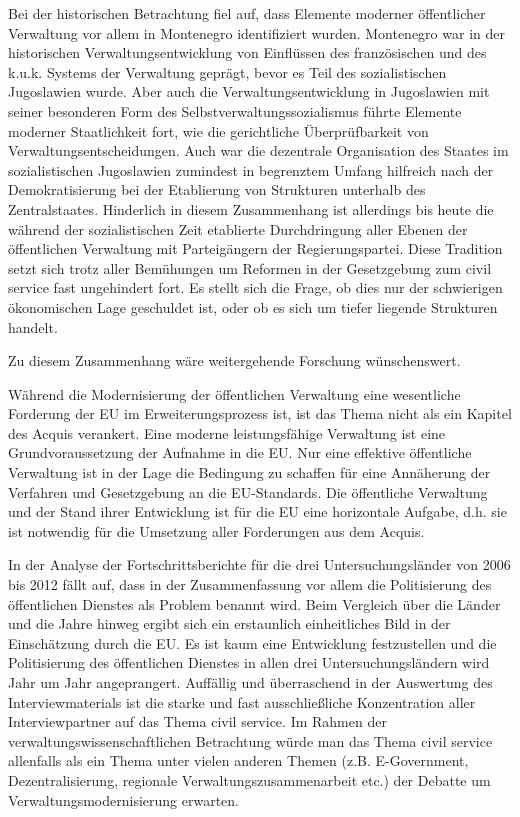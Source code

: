 Bei der historischen Betrachtung fiel auf, dass Elemente moderner öffentlicher Verwaltung vor allem in Montenegro identifiziert wurden. Montenegro war in der historischen Verwaltungsentwicklung von Einflüssen des französischen und des k.u.k. Systems der Verwaltung geprägt, bevor es Teil des sozialistischen Jugoslawien wurde. Aber auch die Verwaltungsentwicklung in Jugoslawien mit seiner besonderen Form des Selbstverwaltungssozialismus führte Elemente moderner Staatlichkeit fort, wie die gerichtliche Überprüfbarkeit von Verwaltungsentscheidungen. Auch war die dezentrale Organisation des Staates im sozialistischen Jugoslawien zumindest in begrenztem Umfang hilfreich nach der Demokratisierung bei der Etablierung von Strukturen unterhalb des Zentralstaates. Hinderlich in diesem Zusammenhang ist allerdings bis heute die während der sozialistischen Zeit etablierte Durchdringung aller Ebenen der öffentlichen Verwaltung mit Parteigängern der Regierungspartei. Diese Tradition setzt sich trotz aller Bemühungen um Reformen in der Gesetzgebung zum civil service fast ungehindert fort. Es stellt sich die Frage, ob dies nur der schwierigen ökonomischen Lage geschuldet ist, oder ob es sich um tiefer liegende Strukturen handelt. \par
Zu diesem Zusammenhang wäre weitergehende Forschung wünschenswert. \par
Während die Modernisierung der öffentlichen Verwaltung eine wesentliche Forderung der EU im Erweiterungsprozess ist, ist das Thema nicht als ein Kapitel des Acquis verankert. Eine moderne leistungsfähige Verwaltung ist eine Grundvoraussetzung der Aufnahme in die EU. Nur eine effektive öffentliche Verwaltung ist in der Lage die Bedingung zu schaffen für eine Annäherung der Verfahren und Gesetzgebung an die EU-Standards. Die öffentliche Verwaltung und der Stand ihrer Entwicklung ist für die EU eine horizontale Aufgabe, d.h. sie ist notwendig für die Umsetzung aller Forderungen aus dem Acquis.\par
In der Analyse der Fortschrittsberichte für die drei Untersuchungsländer von 2006 bis 2012 fällt auf, dass in der Zusammenfassung vor allem die Politisierung des öffentlichen Dienstes als Problem benannt wird. Beim Vergleich über die Länder und die Jahre hinweg ergibt sich ein erstaunlich einheitliches Bild in der Einschätzung durch die EU. Es ist kaum eine Entwicklung festzustellen und die Politisierung des öffentlichen Dienstes in allen drei Untersuchungsländern wird Jahr um Jahr angeprangert. Auffällig und überraschend in der Auswertung des Interviewmaterials ist die starke und fast ausschließliche Konzentration aller Interviewpartner auf das Thema civil service. Im Rahmen der verwaltungswissenschaftlichen Betrachtung würde man das Thema civil service allenfalls als ein Thema unter vielen anderen Themen (z.B. E-Government, Dezentralisierung, regionale Verwaltungszusammenarbeit etc.) der Debatte um Verwaltungsmodernisierung erwarten.\par

